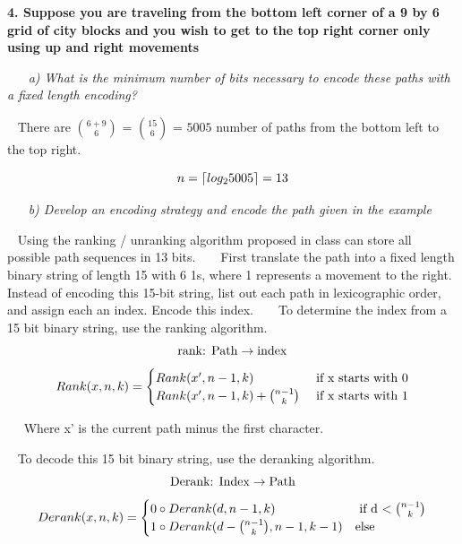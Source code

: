 \documentclass[12pt, letterpaper]{article}
\DeclarePairedDelimiter{\ceil}{\lceil}{\rceil}
\begin{document}
\newpage
\bf{ 4. Suppose you are traveling from the bottom left corner of a 9 by 6 grid of city blocks and you wish to get to the top right corner only using up and right movements }

\-\ \newline
\-\ \it{ a) What is the minimum number of bits necessary to encode these paths with a fixed length encoding? }

\-\ \newline
\textnormal{There are \(6 + 9 \choose 6\) = \(15 \choose 6\) = \( 5005 \) number of paths from the bottom left to the top right.  }

\[ n = \ceil{ log_2{5005} } = 13 \]


\-\ \newline
\-\ \it{ b) Develop an encoding strategy and encode the path given in the example }

\-\ \newline
\textnormal{ Using the ranking / unranking algorithm proposed in class can store all possible path sequences in 13 bits.  }
\-\ \newline
\-\ \newline
\textnormal{ First translate the path into a fixed length binary string of length 15 with 6 1s, where 1 represents a movement to the right. Instead of encoding this 15-bit string, list out each path in lexicographic order, and assign each an index. Encode this index.  }
\-\ \newline
\-\ \newline
\textnormal{ To determine the index from a 15 bit binary string, use the ranking algorithm. }
\[\textnormal{rank: Path} \rightarrow \textnormal{index} \]
\[ Rank(x, n, k) = \begin{cases} 
      Rank( x', n-1, k ) & \textnormal{ if x starts with 0} \\
      Rank( x', n-1, k ) + {n - 1 \choose k} & \textnormal{ if x starts with 1}
   \end{cases}
\]

\-\ \newline
\-\ Where x' is the current path minus the first character.


\-\ \newline \newline
\textnormal{To decode this 15 bit binary string, use the deranking algorithm.}
\[ \textnormal{Derank: Index} \rightarrow \textnormal{Path} \]
\[ Derank(x, n, k) = \begin{cases}
    0 \circ Derank(d, n-1, k) & \textnormal{ if d \(< {n - 1 \choose k}\)} \\
    1 \circ Derank(d - {n-1 \choose k}, n-1, k-1) & \textnormal{else}
\end{cases}
\]
\end{document}
